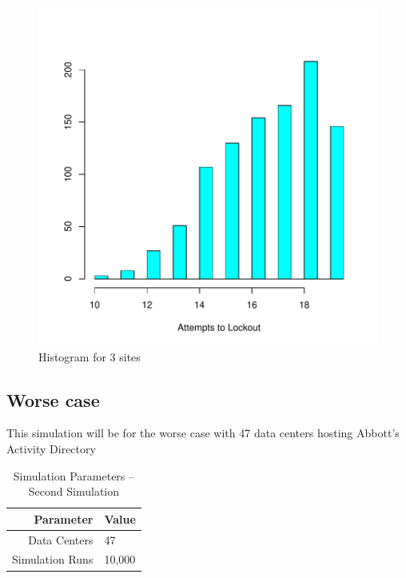 \documentclass[11pt, letterpaper]{article}
\begin{document}
\begin{figure}[H]
\centering
\includegraphics{Report-003}
	\caption{Histogram for 3 sites}
	\label{fig:hist_1}
\end{figure}

\subsection{Worse case}
This simulation will be for the worse case with 47 data centers hosting Abbott's
Activity Directory

\begin{table}[H]
	\centering
	\caption{Simulation Parameters -- Second Simulation}
	\begin{tabular}{||r|l||}
		\hline \hline
		Parameter & Value \\ \hline \hline
		Data Centers & 47 \\ \hline
		Simulation Runs & 10,000 \\ \hline \hline
	\end{tabular}
	\label{tab:Sim2_set}
\end{table}
\end{document}
